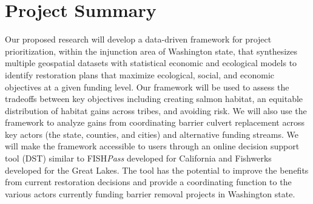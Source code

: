 \documentclass[12pt]{elsarticle}
\begin{document}
\section{Project Summary}\label{sec:summary} %

Our proposed research will develop a data-driven framework for project prioritization, within the injunction area of Washington state, that synthesizes multiple geospatial datasets with statistical economic and ecological models to identify restoration plans that maximize ecological, social, and economic objectives at a given funding level. Our framework will be used to assess the tradeoffs between key objectives including creating salmon habitat, an equitable distribution of habitat gains across tribes, and avoiding risk. We will also use the framework to analyze gains from coordinating barrier culvert replacement across key actors (the state, counties, and cities) and alternative funding streams. We will make the framework accessible to users through an online decision support tool (DST) similar to FISH\emph{Pass} developed for California and Fishwerks developed for the Great Lakes. The tool has the potential to improve the benefits from current restoration decisions and provide a coordinating function to the various actors currently funding barrier removal projects in Washington state. 


\end{document}
